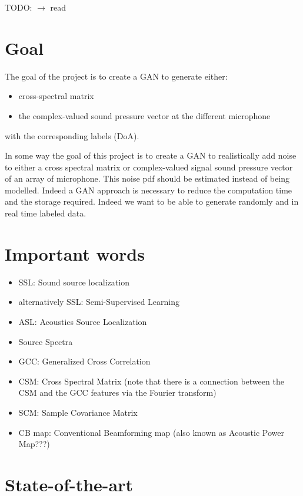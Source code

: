 \documentclass{article}
\begin{document}
TODO: $\rightarrow$ read \cite{10.1007/978-3-030-38961-1_8}



\section{Goal}

The goal of the project is to create a GAN to generate either:
\begin{itemize}
    \item cross-spectral matrix
    \item the complex-valued sound pressure vector at the different microphone
\end{itemize}
with the corresponding labels (DoA).

In some way the goal of this project is to create a GAN to realistically add noise to either a cross spectral matrix or complex-valued signal sound pressure vector of an array of microphone. This noise pdf should be estimated instead of being modelled. Indeed a GAN approach is necessary to reduce the computation time and the storage required. Indeed we want to be able to generate randomly and in real time labeled data.  


\section{Important words}

\begin{itemize}
    \item SSL: Sound source localization
    \item alternatively SSL: Semi-Supervised Learning
    \item ASL: Acoustics Source Localization    
    \item Source Spectra
    \item GCC: Generalized Cross Correlation
    \item CSM: Cross Spectral Matrix (note that there is a connection between the CSM and the GCC features via the Fourier transform)
    \item SCM: Sample Covariance Matrix
    \item CB map: Conventional Beamforming map (also known as Acoustic Power Map???)
\end{itemize}

\section{State-of-the-art}
\end{document}
